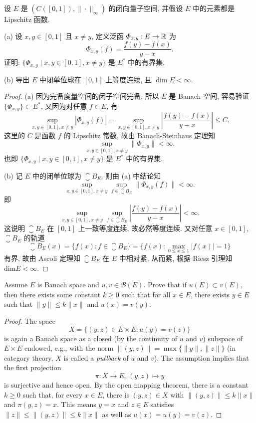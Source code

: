 \begin{exercise}[8]
    设 $E$ 是 $(C([0,1]),\|\cdot\|_{\infty})$ 的闭向量子空间, 并假设 $E$ 中的元素都是 Lipschitz 函数.

    (a) 设 $x,y\in [0,1]$ 且 $x\neq y$, 定义泛函 $\varPhi_{x,y}:E\to\mathbb{R}$ 为
    \[\varPhi_{x,y}(f)=\frac{f(y)-f(x)}{y-x}.\]
    证明: $\{\varPhi_{x,y}\mid x,y\in [0,1],x\neq y\}$ 是 $E^*$ 中的有界集.

    (b) 导出 $E$ 中闭单位球在 $[0,1]$ 上等度连续, 且 $\dim E<\infty$.
\end{exercise}

\begin{proof}
    (a) 因为完备度量空间的闭子空间完备, 所以 $E$ 是 Banach 空间,
    容易验证 $\{\varPhi_{x,y}\}\subset E^*$, 又因为对任意 $f\in E$, 有
    \[\sup_{x,y\in[0,1],x\neq y}|\varPhi_{x,y}(f)|=\sup_{x,y\in[0,1],x\neq y}\left|\frac{f(y)-f(x)}{y-x}\right|\leq C.\]
    这里的 $C$ 是函数 $f$ 的 Lipschitz 常数, 故由 Banach-Steinhaus 定理知
    \[\sup_{x,y\in[0,1],x\neq y}\|\varPhi_{x,y}\|<\infty.\]
    也即 $\{\varPhi_{x,y}\mid x,y\in[0,1],x\neq y\}$ 是 $E^*$ 中的有界集.

    (b) 记 $E$ 中的闭单位球为 $\closure{B_E}$, 则由 (a) 中结论知
    \[\sup_{x,y\in[0,1],x\neq y}\sup_{f\in \closure{B_E}}\|\varPhi_{x,y}(f)\|<\infty.\]
    即
    \[\sup_{x,y\in[0,1],x\neq y}\sup_{f\in \closure{B_E}}\left|\frac{f(y)-f(x)}{y-x}\right|<\infty.\]
    这说明 $\closure{B_E}$ 在 $[0,1]$ 上一致等度连续, 故必然等度连续.
    又对任意 $x\in[0,1]$, $\closure{B_E}$ 的轨道
    \[\closure{B_E}(x)=\{f(x):f\in \closure{B_E}\}=\{f(x):\max_{0\leq x\leq 1}|f(x)|=1\}\]
    有界, 故由 Ascoli 定理知 $\closure{B_E}$ 在 $E$ 中相对紧, 从而紧, 根据 Riesz 引理知 $\textrm{dim}E<\infty$.
\end{proof}


\begin{exercise}
  Assume $E$ is Banach space and $u,v\in\mathcal{B}(E)$. Prove that
  if $u(E)\subset v(E)$, then there exists some constant $k\geq 0$
  such that for all $x\in E$, there exists $y\in E$ such that
  $\|y\|\leq k\|x\|$ and $u(x) = v(y)$.
\end{exercise}

\begin{proof}
  The space
  \[X=\{(y,z)\in E\times E: u(y)=v(z)\}\]
  is again a Banach space as a closed (by the continuity of $u$ and $v$) 
  subspace of $E\times E$ endowed, e.g., with the norm $\|(y,z)\|=\max\{\|y\|,\|z\|\}$
  (in category theory, $X$ is called a \emph{pullback} of $u$ and $v$).
  The assumption implies that the first projection
  \[\pi:X\to E,\, (y,z)\mapsto y\]
  is surjective and hence open. By the open mapping theorem,
  there is a constant $k\geq 0$ such that,
  for every $x\in E$, there is $(y,z)\in X$ with $\|(y,z)\|\le k\|x\|$ and $\pi(y,z)=x$.
  This means $y=x$ and $z\in E$ satisfies $\|z\|\le\|(y,z)\|\le k\|x\|$
  as well as $u(x)=u(y)=v(z)$.
\end{proof}


